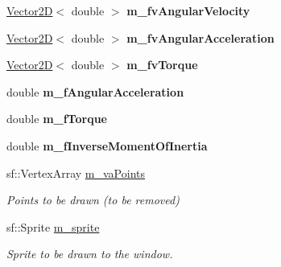 \begin{DoxyCompactItemize}
\item 
\hypertarget{class_collidable_a9913b4fa9f36e30a83940ac333da4b99}{}\hyperlink{class_vector2_d}{Vector2\+D}$<$ double $>$ {\bfseries m\+\_\+fv\+Angular\+Velocity}\label{class_collidable_a9913b4fa9f36e30a83940ac333da4b99}

\item 
\hypertarget{class_collidable_ad0a8edff679d8f048023dc5f7f560b0b}{}\hyperlink{class_vector2_d}{Vector2\+D}$<$ double $>$ {\bfseries m\+\_\+fv\+Angular\+Acceleration}\label{class_collidable_ad0a8edff679d8f048023dc5f7f560b0b}

\item 
\hypertarget{class_collidable_a8c45a631264b9ae9d57617deefe3bf92}{}\hyperlink{class_vector2_d}{Vector2\+D}$<$ double $>$ {\bfseries m\+\_\+fv\+Torque}\label{class_collidable_a8c45a631264b9ae9d57617deefe3bf92}

\item 
\hypertarget{class_collidable_a376aa200ba174a1cea17766fbcbda760}{}double {\bfseries m\+\_\+f\+Angular\+Acceleration}\label{class_collidable_a376aa200ba174a1cea17766fbcbda760}

\item 
\hypertarget{class_collidable_a84f79454b1dac54f7b9042660d89e8ca}{}double {\bfseries m\+\_\+f\+Torque}\label{class_collidable_a84f79454b1dac54f7b9042660d89e8ca}

\item 
\hypertarget{class_collidable_aef9f604795e30d09737aee26beb128ae}{}double {\bfseries m\+\_\+f\+Inverse\+Moment\+Of\+Inertia}\label{class_collidable_aef9f604795e30d09737aee26beb128ae}

\item 
\hypertarget{class_collidable_a13a62d6d9fb69397c5ad03e6ec1c3b2d}{}sf\+::\+Vertex\+Array \hyperlink{class_collidable_a13a62d6d9fb69397c5ad03e6ec1c3b2d}{m\+\_\+va\+Points}\label{class_collidable_a13a62d6d9fb69397c5ad03e6ec1c3b2d}

\begin{DoxyCompactList}\small\item\em Points to be drawn (to be removed) \end{DoxyCompactList}\item 
\hypertarget{class_collidable_a5392bcb0ef0fef2e60b68a447e4d0ae7}{}sf\+::\+Sprite \hyperlink{class_collidable_a5392bcb0ef0fef2e60b68a447e4d0ae7}{m\+\_\+sprite}\label{class_collidable_a5392bcb0ef0fef2e60b68a447e4d0ae7}

\begin{DoxyCompactList}\small\item\em Sprite to be drawn to the window. \end{DoxyCompactList}\end{DoxyCompactItemize}


